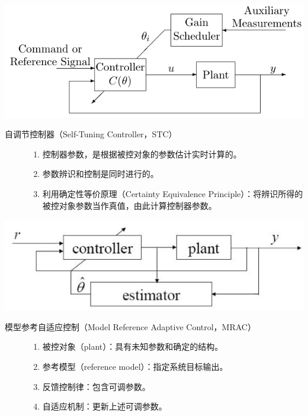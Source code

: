   \begin{center}
  \includegraphics[scale=0.5]{figure/adaptive/gain_scheduling.png}
\end{center}
  \begin{description}
    \item[自调节控制器（Self-Tuning Controller，STC）]
    \begin{enumerate}
      \item 控制器参数，是根据被控对象的参数估计实时计算的。
      
      \item 参数辨识和控制是同时进行的。
      
      \item 利用确定性等价原理（Certainty Equivalence Principle）：将辨识所得的被控对象参数当作真值，由此计算控制器参数。
    \end{enumerate}
  \end{description}
  \begin{center}
  \includegraphics[scale=0.5]{figure/adaptive/stc.png}
  \captionsetup{hypcap=false}
\end{center}
  \begin{description}
    \item[模型参考自适应控制（Model Reference Adaptive Control，MRAC）]
    \begin{enumerate}
      \item 被控对象（plant）：具有未知参数和确定的结构。
      
      \item 参考模型（reference model）：指定系统目标输出。
      
      \item 反馈控制律：包含可调参数。
      
      \item 自适应机制：更新上述可调参数。
    \end{enumerate}
  \end{description}
